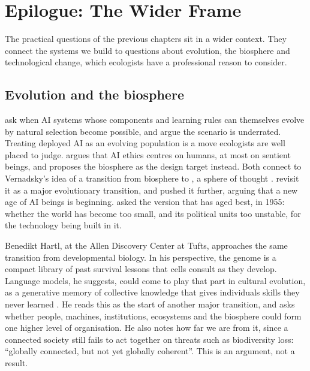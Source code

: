 \chapter{Epilogue: The Wider Frame}
\label{ch:epilogue}

The practical questions of the previous chapters sit in a wider context. They
connect the systems we build to questions about evolution, the biosphere and
technological change, which ecologists have a professional reason to consider.

\section{Evolution and the biosphere}

\textcite{muller2026evolvableai} ask when AI systems whose components and
learning rules can themselves evolve by natural selection become possible, and
argue the scenario is underrated. Treating deployed AI as an evolving population
is a move ecologists are well placed to judge. \textcite{korecki2025biosphericai}
argues that AI ethics centres on humans, at most on sentient beings, and
proposes the biosphere as the design target instead. Both connect to Vernadsky's
idea of a transition from biosphere to , a sphere of thought
\parencite{vernadsky1938noosphere}. \textcite{vidal2024noosphere} revisit it as
a major evolutionary transition, and \textcite{lovelock2019novacene} pushed it
further, arguing that a new age of AI beings is beginning. \textcite{vonneumann1955survive} asked the version that has aged
best, in 1955: whether the world has become too small, and its political units
too unstable, for the technology being built in it.

Benedikt Hartl, at the Allen Discovery Center at Tufts, approaches the same
transition from developmental biology. In his perspective, the genome is a compact
library of past survival lessons that cells consult as they develop.
Language models, he suggests, could come to play that part in cultural
evolution, as a generative memory of collective knowledge that gives
individuals skills they never learned \parencite{hartl2026moreisdifferent}. He
reads this as the start of another major transition, and asks whether people,
machines, institutions, ecosystems and the biosphere could form one higher
level of organisation. He also notes how far we are from it, since a
connected society still fails to act together on threats such as biodiversity
loss: ``globally connected, but not yet globally coherent''. This is an
argument, not a result.

